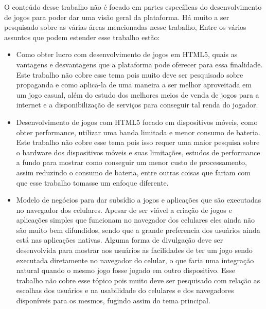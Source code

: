 O conteúdo desse trabalho não é focado em partes específicas do
desenvolvimento de jogos para poder dar uma visão geral da plataforma.
Há muito a ser pesquisado sobre as várias áreas mencionadas nesse
trabalho, Entre os vários assuntos que podem estender esse trabalho
estão:

\begin{itemize}
    \item Como obter lucro com desenvolvimento de jogos em HTML5, quais as vantagens
    e desvantagens que a plataforma pode oferecer para essa
    finalidade. Este trabalho não cobre esse tema pois muito deve ser
    pesquisado sobre propaganda e como aplica-la de uma maneira a ser
    melhor aproveitada em um jogo casual, além do estudo dos melhores
    meios de venda de jogos para a internet e a disponibilização de
    serviços para conseguir tal renda do jogador.

    \item Desenvolvimento de jogos com HTML5 focado em dispositivos móveis, como
    obter performance, utilizar uma banda limitada e menor consumo de
    bateria. Este trabalho não cobre esse tema pois isso requer uma maior
    pesquisa sobre o hardware dos dispositivos móveis e suas limitações,
    estudos de performance a fundo para mostrar como conseguir um menor
    custo de processamento, assim reduzindo o consumo de bateria, entre
    outras coisas que fariam com que esse trabalho tomasse um enfoque
    diferente.

    \item Modelo de negócios para dar subsídio a jogos e aplicações
    que são executadas no navegador dos celulares. Apesar de ser viável
    a criação de jogos e aplicações simples que funcionam no navegador
    dos celulares eles ainda não são muito bem difundidos, sendo que a
    grande preferencia dos usuários ainda está nas aplicações nativas.
    Alguma forma de divulgação deve ser desenvolvida para mostrar aos
    usuários as facilidades de ter um jogo sendo executada diretamente
    no navegador do celular, o que faria uma integração natural quando
    o mesmo jogo fosse jogado em outro dispositivo. Esse trabalho não
    cobre esse tópico pois muito deve ser pesquisado com relação as
    escolhas dos usuários e na usabilidade do celulares e dos
    navegadores disponíveis para os mesmos, fugindo assim do tema
    principal.
\end{itemize}
